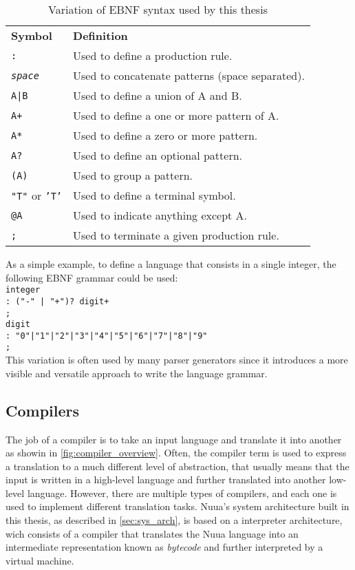 \begin{table}[H]
    \centering
    \begin{tabular}{ l p{10cm} }
        \textbf{Symbol} & \textbf{Definition} \\
        \texttt{:} & Used to define a production rule. \\
        \texttt{\textit{space}} & Used to concatenate patterns (space separated). \\
        \texttt{A|B} & Used to define a union of A and B. \\
        \texttt{A+} & Used to define a one or more pattern of A. \\
        \texttt{A*} & Used to define a zero or more pattern. \\
        \texttt{A?} & Used to define an optional pattern. \\
        \texttt{(A)} & Used to group a pattern. \\
        \texttt{"T"} or \texttt{'T'} & Used to define a terminal symbol. \\
        \texttt{@A} & Used to indicate anything except A. \\
        \texttt{;} & Used to terminate a given production rule. \\
    \end{tabular}
    \caption{Variation of EBNF syntax used by this thesis}
    \label{fig:ebnf_syntax}
\end{table}

As a simple example, to define a language that consists in a single integer, the following EBNF grammar could be used:\\

\texttt{integer\\\tab: ("-" | "+")? digit+\\\tab;}\\
\texttt{digit\\\tab: "0"|"1"|"2"|"3"|"4"|"5"|"6"|"7"|"8"|"9"\\\tab;}\\

This variation is often used by many parser generators since it introduces a more visible and versatile approach to
write the language grammar.

\subsection{Compilers}

The job of a compiler is to take an input language and translate it into another as showin in \autoref{fig:compiler_overview}.
Often, the compiler term is used to express a translation to a much different level of abstraction, that usually means
that the input is written in a high-level language and further translated into another low-level language.
However, there are multiple types of compilers, and each one is used to implement different translation tasks.
Nuua's system architecture built in this thesis, as described in \autoref{sec:sys_arch}, is based on a interpreter architecture, wich consists of a
compiler that translates the Nuua language into an intermediate representation known as \emph{bytecode} and further interpreted by a virtual machine.

